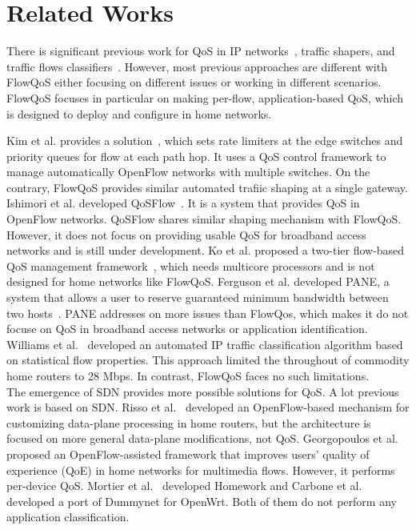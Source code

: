 \section{Related Works}
\label{sec:related-works}

There is significant previous work for QoS in IP networks~\cite{aurrecoechea1998survey, mcdysan1999qos, newman1996ipsilon}, traffic shapers, and traffic flows classifiers~\cite{roughan2004class}. However, most previous approaches are different with FlowQoS either focusing on different issues or working in different scenarios. FlowQoS focuses in particular on making per-flow, application-based QoS, which is designed to deploy and configure in home networks. 

Kim et al. provides a solution~\cite{kim2010automated}, which sets rate limiters at the edge switches and priority queues for flow at each path hop. It uses a QoS control framework to manage automatically OpenFlow networks with multiple switches. On the contrary, FlowQoS provides similar automated trafiic shaping at a single gateway. Ishimori et al. developed QoSFlow~\cite{ishimori2012automatic}. It is a system that provides QoS in OpenFlow networks. QoSFlow shares similar shaping mechanism with FlowQoS. However, it does not focus on providing usable QoS for broadband access networks and is still under development. 
Ko et al. proposed a two-tier flow-based QoS management framework~\cite{nam2013openqflow}, which needs multicore processors and is not designed for home networks like FlowQoS. Ferguson et al. developed PANE, a system that allows a user to reserve guaranteed minimum bandwidth between two hosts~\cite{ferguson2013participatory}. PANE addresses on more issues than FlowQos, which makes it do not focuse on QoS in broadband access networks or application identification. Williams et al.~\cite{williams2011real} developed an automated IP traffic classification algorithm based on statistical flow properties. This approach limited the throughout of commodity home routers
to 28 Mbps. In contrast, FlowQoS faces no such limitations.\\




The emergence of SDN provides more possible solutions for QoS. A lot previous work is based on SDN. Risso et al.~\cite{risso2012customizing} developed an OpenFlow-based mechanism
for customizing data-plane processing in home routers, but
the architecture is focused on more general data-plane modifications, not QoS. Georgopoulos et al.~\cite{georgopoulos2013towards} proposed an OpenFlow-assisted framework that improves users’ quality of experience (QoE) in home networks for multimedia flows. However, it performs per-device QoS. Mortier et al.~\cite{mortier2011supporting} developed Homework and Carbone et al.~\cite{carbone2010dummynet} developed a port of Dummynet for OpenWrt. Both of them do not perform any application classification. 





